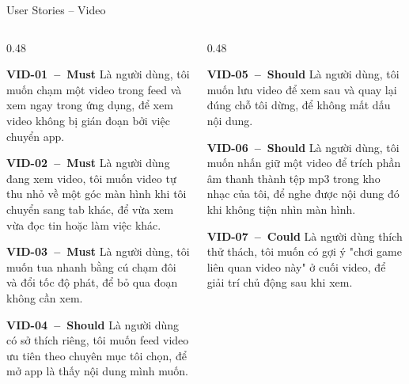 \documentclass[aspectratio=169]{beamer}
\begin{document}
\begin{frame}{User Stories -- Video}
  \begin{columns}
    \begin{column}{0.48\textwidth}
      \begin{block}{\scriptsize\bfseries VID-01~--~Must}
        {\tiny Là người dùng, tôi muốn chạm một video trong feed và xem ngay trong ứng dụng, để xem video không bị gián đoạn bởi việc chuyển app.}
      \end{block}
      \begin{block}{\scriptsize\bfseries VID-02~--~Must}
        {\tiny Là người dùng đang xem video, tôi muốn video tự thu nhỏ về một góc màn hình khi tôi chuyển sang tab khác, để vừa xem vừa đọc tin hoặc làm việc khác.}
      \end{block}
      \begin{block}{\scriptsize\bfseries VID-03~--~Must}
        {\tiny Là người dùng, tôi muốn tua nhanh bằng cú chạm đôi và đổi tốc độ phát, để bỏ qua đoạn không cần xem.}
      \end{block}
      \begin{block}{\scriptsize\bfseries VID-04~--~Should}
        {\tiny Là người dùng có sở thích riêng, tôi muốn feed video ưu tiên theo chuyên mục tôi chọn, để mở app là thấy nội dung mình muốn.}
      \end{block}
    \end{column}
    \begin{column}{0.48\textwidth}
      \begin{block}{\scriptsize\bfseries VID-05~--~Should}
        {\tiny Là người dùng, tôi muốn lưu video để xem sau và quay lại đúng chỗ tôi dừng, để không mất dấu nội dung.}
      \end{block}
      \begin{block}{\scriptsize\bfseries VID-06~--~Should}
        {\tiny Là người dùng, tôi muốn nhấn giữ một video để trích phần âm thanh thành tệp mp3 trong kho nhạc của tôi, để nghe được nội dung đó khi không tiện nhìn màn hình.}
      \end{block}
      \begin{block}{\scriptsize\bfseries VID-07~--~Could}
        {\tiny Là người dùng thích thử thách, tôi muốn có gợi ý "chơi game liên quan video này" ở cuối video, để giải trí chủ động sau khi xem.}
      \end{block}
    \end{column}
  \end{columns}
\end{frame}
\end{document}
